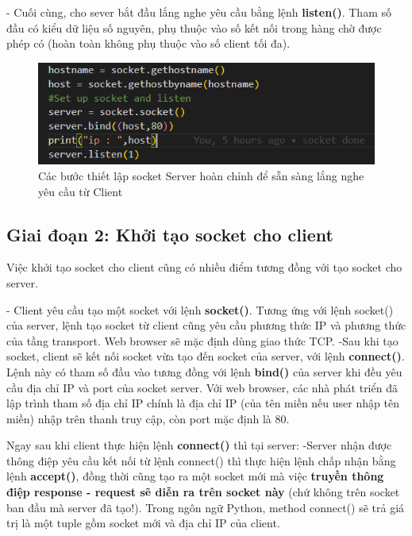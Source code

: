 \documentclass[14pt]{extreport}
\begin{document}
- Cuối cùng, cho sever bắt đầu lắng nghe yêu cầu bằng lệnh {\bf listen()}. \cite{2}Tham số đầu có kiểu dữ liệu số nguyên, phụ thuộc vào số kết nối trong hàng chờ được phép có (hoàn toàn không phụ thuộc vào số client tối đa).

\begin{center}
    \begin{figure}[H]
    \begin{center}
     \includegraphics[scale=.8]{set up socket server.PNG}
    \end{center}
    \caption{Các bước thiết lập socket Server hoàn chỉnh để sẵn sàng lắng nghe yêu cầu từ Client}
    \end{figure}
\end{center}

\subsection{Giai đoạn 2: Khởi tạo socket cho client }
Việc khởi tạo socket cho client cũng có nhiều điểm tương đồng với tạo socket cho server.

- Client yêu cầu tạo một socket với lệnh {\bf socket()}. Tương ứng với lệnh socket() của server, lệnh tạo socket từ client cũng yêu cầu phương thức IP và phương thức của tầng transport. Web browser sẽ mặc định dùng giao thức TCP.
-Sau khi tạo socket, client sẽ kết nối socket vừa tạo đến socket của server, với lệnh {\bf connect()}. Lệnh này có tham số đầu vào tương đồng với lệnh {\bf bind()} của server khi đều yêu cầu địa chỉ IP và port của socket server. Với web browser, các nhà phát triển đã lập trình tham số địa chỉ IP chính là địa chỉ IP (của tên miền nếu user nhập tên miền) nhập trên thanh truy cập, còn port mặc định là 80. 

Ngay sau khi client thực hiện lệnh {\bf connect()} thì tại server:
-Server nhận được thông điệp yêu cầu kết nối từ lệnh connect() thì thực hiện lệnh chấp nhận bằng lệnh {\bf accept()}, đồng thời cũng tạo ra một socket mới mà việc {\bf truyền thông điệp response - request sẽ diễn ra trên socket này} (chứ không trên socket ban đầu mà server đã tạo!). Trong ngôn ngữ Python, method connect() sẽ trả giá trị là một tuple gồm socket mới và địa chỉ IP của client. 
\end{document}
